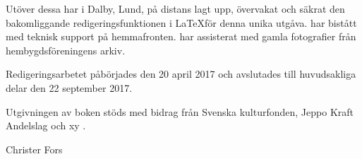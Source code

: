 Utöver dessa har  i Dalby, Lund, på distans lagt upp, övervakat och säkrat den bakomliggande redigeringsfunktionen i  \LaTeX  för denna unika utgåva.  har bistått med teknisk support på hemmafronten.  har assisterat med gamla fotografier från hembygdsföreningens arkiv.

Redigeringsarbetet påbörjades den 20 april 2017 och avslutades till huvudsakliga delar den 22 september 2017.

Utgivningen av boken stöds med bidrag från Svenska kulturfonden, Jeppo Kraft Andelslag och xy .


Christer Fors
